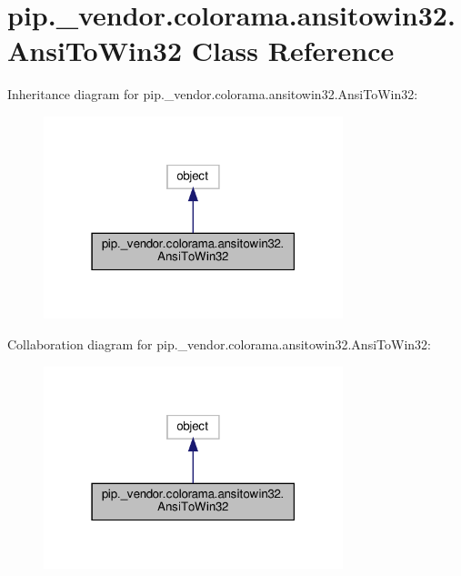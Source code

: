 \hypertarget{classpip_1_1__vendor_1_1colorama_1_1ansitowin32_1_1AnsiToWin32}{}\section{pip.\+\_\+vendor.\+colorama.\+ansitowin32.\+Ansi\+To\+Win32 Class Reference}
\label{classpip_1_1__vendor_1_1colorama_1_1ansitowin32_1_1AnsiToWin32}


Inheritance diagram for pip.\+\_\+vendor.\+colorama.\+ansitowin32.\+Ansi\+To\+Win32\+:
\nopagebreak
\begin{figure}[H]
\begin{center}
\leavevmode
\includegraphics[width=247pt]{classpip_1_1__vendor_1_1colorama_1_1ansitowin32_1_1AnsiToWin32__inherit__graph}
\end{center}
\end{figure}


Collaboration diagram for pip.\+\_\+vendor.\+colorama.\+ansitowin32.\+Ansi\+To\+Win32\+:
\nopagebreak
\begin{figure}[H]
\begin{center}
\leavevmode
\includegraphics[width=247pt]{classpip_1_1__vendor_1_1colorama_1_1ansitowin32_1_1AnsiToWin32__coll__graph}
\end{center}
\end{figure}
